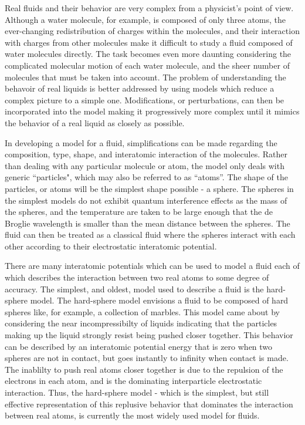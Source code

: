 \documentclass[12pt]{article}
\begin{document}
Real fluids and their behavior are very complex from a physicist's point of view. Although a water molecule, for example, is composed of only three atoms, the ever-changing redistribution of charges within the molecules, and their interaction with charges from other molecules make it difficult to study a fluid composed of water molecules directly. The task becomes even more daunting considering the complicated molecular motion of each water molecule, and the sheer number of molecules that must be taken into account. 
The problem of understanding the behavoir of real liquids is better addressed by using models which reduce a complex picture to a simple one. Modifications, or perturbations, can then be incorporated into the model making it progressively more complex until it mimics the behavior of a real liquid as closely as possible.

In developing a model for a fluid, simplifications can be made regarding the composition, type, shape, and interatomic interaction of the molecules. Rather than dealing with any particular molecule or atom, the model only deals with generic ``particles", which may also be referred to as ``atoms''. The shape of the particles, or atoms will be the simplest shape possible - a sphere. The spheres in the simplest models do not exhibit quantum interference effects as the mass of the spheres, and the temperature are taken to be large enough that the de Broglie wavelength is smaller than the mean distance between the spheres. The fluid can then be treated as a classical fluid where the spheres interact with each other according to their electrostatic interatomic potential. 

There are many interatomic potentials which can be used to model a fluid each of which describes the interaction between two real atoms to some degree of accuracy. The simplest, and oldest, model used to describe a fluid is the hard-sphere model. The hard-sphere model envisions a fluid to be composed of hard spheres like, for example, a collection of marbles. This model came about by considering the near incompressibilty of liquids indicating that the particles making up the liquid strongly resist being pushed closer together. This behavior can be described by an interatomic potential energy that is zero when two spheres are not in contact, but goes instantly to infinity when contact is made. The inablilty to push real atoms closer together is due to the repulsion of the electrons in each atom, and is the dominating interparticle electrostatic interaction. Thus, the hard-sphere model - which is the simplest, but still effective representation of this replusive behavior that dominates the interaction between real atoms, is currently the most widely used model for fluids.
\end{document}
